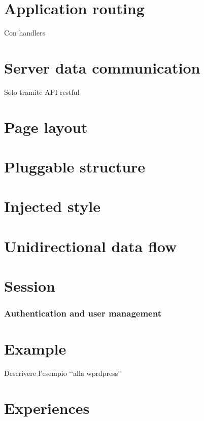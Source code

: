 \documentclass{sig-alternate-05-2015}
\begin{document}
\section{Application routing}
Con handlers

\section{Server data communication}
Solo tramite API restful

\section{Page layout}

\section{Pluggable structure}

\section{Injected style}

\section{Unidirectional data flow}

\section{Session}

\subsubsection{Authentication and user management}




\section{Example}
Descrivere l'esempio \lq\lq alla wprdpress\rq\rq

\section{Experiences}

\subsection{}
\end{document}
